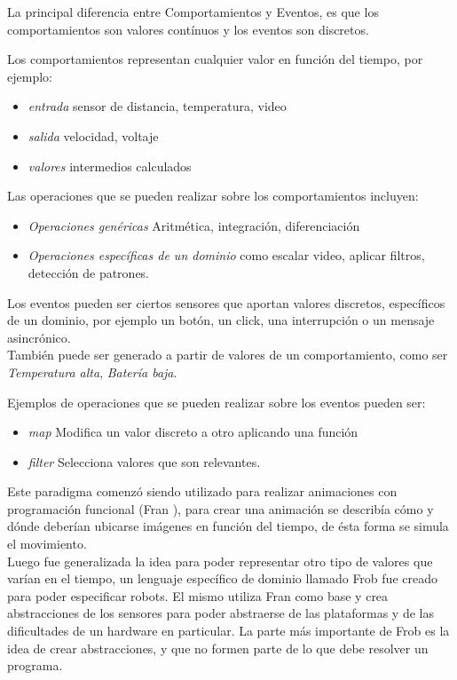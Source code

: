 La principal diferencia entre Comportamientos y Eventos, es que los
comportamientos son valores contínuos y los eventos son discretos.

Los comportamientos representan cualquier valor en función del tiempo,
por ejemplo:
\begin{itemize}
\item \textit{entrada} sensor de distancia, temperatura, video
\item \textit{salida} velocidad, voltaje
\item \textit{valores} intermedios calculados
\end{itemize}

Las operaciones que se pueden realizar sobre los comportamientos incluyen:

\begin{itemize}
\item \textit{Operaciones genéricas} Aritmética, integración, diferenciación
\item \textit{Operaciones específicas de un dominio} como escalar video, aplicar filtros, detección de patrones.
\end{itemize}

Los eventos pueden ser ciertos sensores que aportan valores discretos,
específicos de un dominio, por ejemplo un
botón, un click, una interrupción o un mensaje asincrónico.\\
También puede ser generado a partir de valores de un comportamiento,
como ser \emph{Temperatura alta}, \emph{Batería baja}.

Ejemplos de operaciones que se pueden realizar sobre los eventos pueden ser:

\begin{itemize}
\item \textit{map} Modifica un valor discreto a otro aplicando una función
\item \textit{filter} Selecciona valores que son relevantes.
\end{itemize}



  Este paradigma comenzó siendo utilizado para realizar animaciones con programación
funcional (Fran \cite{ElliotHudak97:Fran}), para crear una animación se describía
cómo y dónde deberían ubicarse imágenes en función del tiempo, de ésta forma se simula
el movimiento.\\
  Luego fue generalizada la idea para poder representar otro tipo de valores que
varían en el tiempo, un lenguaje específico de dominio llamado
Frob \cite{petersonhudakelliot99:lambdainmotion} fue creado para poder especificar
robots. El mismo utiliza Fran como base y crea abstracciones de los sensores
para poder abstraerse de las plataformas y de las dificultades de un hardware en particular.
  La parte más importante de Frob es la idea de crear abstracciones, y que no formen
parte de lo que debe resolver un programa.

